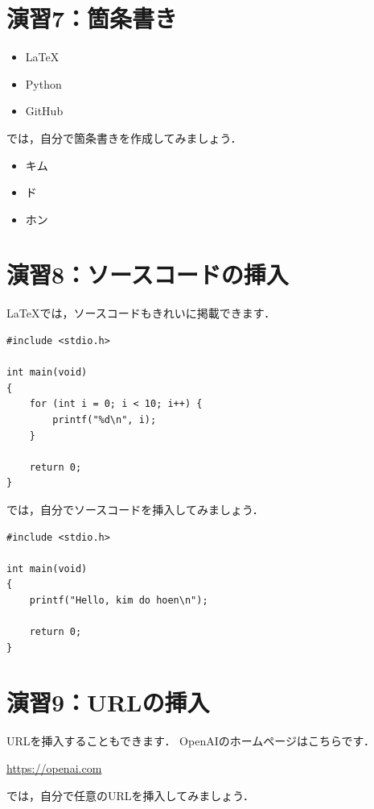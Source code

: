 \documentclass[a4paper,twocolumn]{jsarticle}
\begin{document}
\section*{演習7：箇条書き}
\begin{itemize}
    \item LaTeX
    \item Python
    \item GitHub
\end{itemize}

では，自分で箇条書きを作成してみましょう．


\begin{itemize}
    \item キム
    \item ド
    \item ホン
\end{itemize}

\section*{演習8：ソースコードの挿入}
LaTeXでは，ソースコードもきれいに掲載できます．

\begin{lstlisting}
#include <stdio.h>

int main(void)
{
    for (int i = 0; i < 10; i++) {
        printf("%d\n", i);
    }

    return 0;
}
\end{lstlisting}

では，自分でソースコードを挿入してみましょう．


\begin{lstlisting}
#include <stdio.h>

int main(void)
{
    printf("Hello, kim do hoen\n");

    return 0;
}
\end{lstlisting}

\section*{演習9：URLの挿入}
URLを挿入することもできます．
OpenAIのホームページはこちらです．

\url{https://openai.com}

では，自分で任意のURLを挿入してみましょう．

\end{document}
